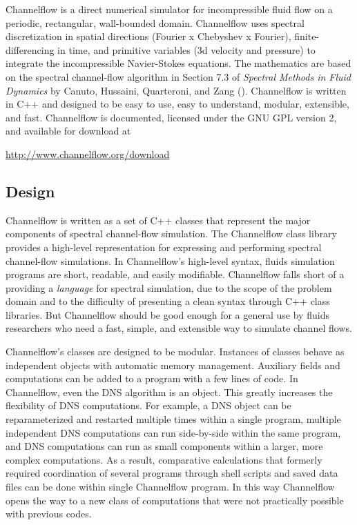 \documentclass{article}[12pt]
\begin{document}
Channelflow is a direct numerical simulator for incompressible fluid
flow on a periodic, rectangular, wall-bounded domain. Channelflow uses
spectral discretization in spatial directions (Fourier x Chebyshev x
Fourier), finite-differencing in time, and primitive variables (3d
velocity and pressure) to integrate the incompressible Navier-Stokes
equations. The mathematics are based on the spectral channel-flow
algorithm in Section 7.3 of {\em Spectral Methods in Fluid Dynamics}
by Canuto, Hussaini, Quarteroni, and Zang (\cite{Canuto88}).
Channelflow is written in C++ and designed to be easy to use, easy to
understand, modular, extensible, and fast. Channelflow is documented,
licensed under the GNU GPL version 2, and available for download at

\begin{center}
\url{http://www.channelflow.org/download}
\end{center}

%
\subsection{Design}

Channelflow is written as a set of C++ classes that represent the
major components of spectral channel-flow simulation. The Channelflow
class library provides a high-level representation for expressing and
performing spectral channel-flow simulations. In Channelflow's
high-level syntax, fluids simulation programs are short, readable, and
easily modifiable. Channelflow falls short of a providing a {\em
language} for spectral simulation, due to the scope of the problem
domain and to the difficulty of presenting a clean syntax through C++
class libraries. But Channelflow should be good enough for a general
use by fluids researchers who need a fast, simple, and extensible way
to simulate channel flows.

Channelflow's classes are designed to be modular. Instances of classes
behave as independent objects with automatic memory management.
Auxiliary fields and computations can be added to a program with a few
lines of code. In Channelflow, even the DNS algorithm is an object.
This greatly increases the flexibility of DNS computations. For
example, a DNS object can be reparameterized and restarted multiple times
within a single program, multiple independent DNS computations can run
side-by-side within the same program, and DNS computations can run as
small components within a larger, more complex computations. As a
result, comparative calculations that formerly required coordination
of several programs through shell scripts and saved data files can
be done within single Channelflow program. In this way Channelflow
opens the way to a new class of computations that were not practically
possible with previous codes.
\end{document}
